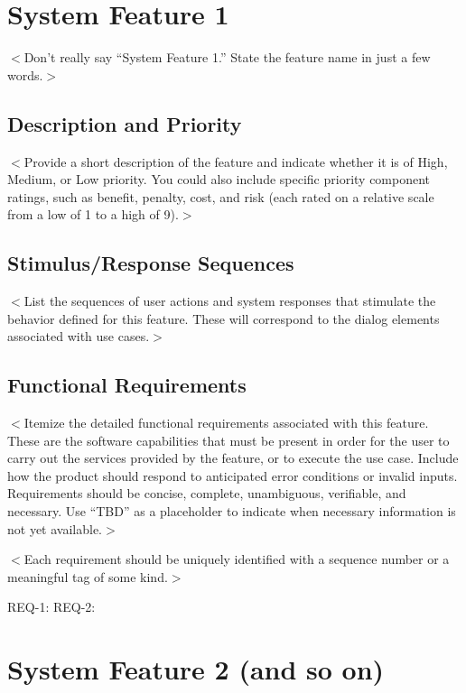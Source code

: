 \documentclass{scrreprt}
\begin{document}
\section{System Feature 1}
$<$Don’t really say “System Feature 1.” State the feature name in just a few 
words.$>$

\subsection{Description and Priority}
$<$Provide a short description of the feature and indicate whether it is of 
High, Medium, or Low priority. You could also include specific priority 
component ratings, such as benefit, penalty, cost, and risk (each rated on a 
relative scale from a low of 1 to a high of 9).$>$

\subsection{Stimulus/Response Sequences}
$<$List the sequences of user actions and system responses that stimulate the 
behavior defined for this feature. These will correspond to the dialog elements 
associated with use cases.$>$

\subsection{Functional Requirements}
$<$Itemize the detailed functional requirements associated with this feature.  
These are the software capabilities that must be present in order for the user 
to carry out the services provided by the feature, or to execute the use case.  
Include how the product should respond to anticipated error conditions or 
invalid inputs. Requirements should be concise, complete, unambiguous, 
verifiable, and necessary. Use “TBD” as a placeholder to indicate when necessary 
information is not yet available.$>$

$<$Each requirement should be uniquely identified with a sequence number or a 
meaningful tag of some kind.$>$

REQ-1:  REQ-2:

\section{System Feature 2 (and so on)}


\end{document}
